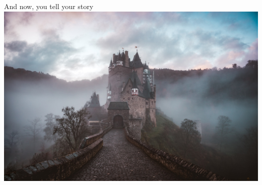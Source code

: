 
\begin{frame}{And now, you tell your story}
\centering
\includegraphics[height=0.7\textheight]{images/cederic-vandenberghe-21DP3hytVHw-unsplash.jpg}

\end{frame}


\begin{frame}[plain]

\centering


\end{frame}




